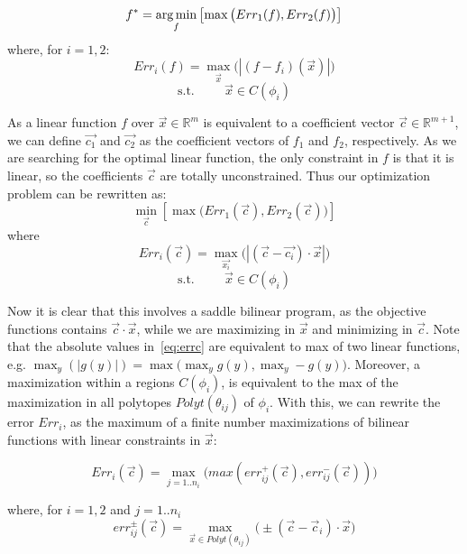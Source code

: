 \begin{equation} f^* = \argmin_f \left[ \max \big( Err_1(f), Err_2(f) \big) \right] \label{eq:fstar} \end{equation}
where, for $i = 1,2$:
\begin{equation} Err_i(f) = \max_{\vec{x}} \big(  | (f - f_i)(\vec{x}) | \big) \label{eq:errf} \end
{equation}
$$\text{s.t.} \hspace{1cm} \vec{x} \in C(\phi_i)$$

As a linear function $f$ over $\vec{x} \in \mathbb{R}^m$ is equivalent to a coefficient vector $\vec{c} \in \mathbb{R}^{m+1}$, we can define $\vec{c_1}$ and $\vec{c_2}$ as the coefficient vectors of $f_1$ and $f_2$, respectively. As we are searching for the optimal linear function, the only constraint in $f$ is that it is linear, so the coefficients $\vec{c}$ are totally unconstrained. Thus our optimization problem can be rewritten as:
\begin{equation} \min_{\vec{c}} \left[ \max \big( Err_1(\vec{c}), Err_2(\vec{c}) \big) \right] \label{eq:minc} \end{equation}
where
\begin{equation} Err_i(\vec{c}) = \max_{\vec{x_i}} \big(  | (\vec{c}-\vec{c_i}) \cdot \vec{x} |\big) \label{eq:errc} \end
{equation}
$$\text{s.t.} \hspace{1cm} \vec{x} \in C(\phi_i)$$

Now it is clear that this involves a saddle bilinear program, as the objective functions contains $\vec{c} \cdot \vec{x}$, while we are maximizing in $\vec{x}$ and minimizing in $\vec{c}$. 
Note that the absolute values in~\ref{eq:errc} are equivalent to max of two linear functions, e.g. $\max_y (|g(y)|) = \max \big( \max_y g(y), \max_y -g(y) \big)$. Moreover, a maximization within a regions $C(\phi_i)$, is equivalent to the max of the maximization in all polytopes $Polyt(\theta_{ij})$ of $\phi_i$. With this, we can rewrite the error $Err_i$, as the maximum of a finite number maximizations of bilinear functions with linear constraints in $\vec{x}$:
{\footnotesize 
\vspace{-2mm}
\begin{equation} Err_i(\vec{c}) = \max_{j=1..n_i} \big( max ( err^+_{ij}(\vec{c}), err^-_{ij}(\vec{c}) ) \big) \label{eq:errcij} \end{equation}
\vspace{-5mm}

where, for $i=1,2$ and $j=1..n_i$
\vspace{-1mm}
\begin{equation} err^{\pm}_{ij}(\vec{c}) = \max_{\vec{x} \in Polyt(\theta_{ij})} \big( \pm(\vec{c} - \vec{c}_i)\cdot \vec{x} \big)  \label{eq:polymax} \end{equation}
\vspace{-2mm}
}

